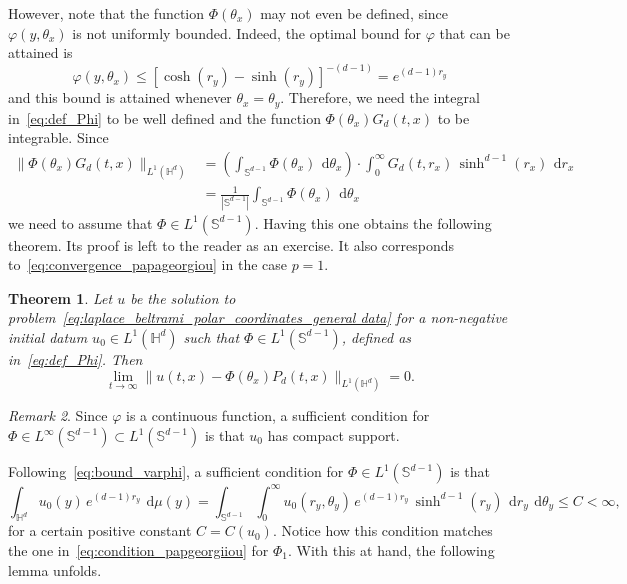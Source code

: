 \documentclass[12pt,longbibliography]{article}
\def\d{\,\mathrm{d}}
\def\d{\,\mathrm{d}}
\def\H{\mathbb{H}}
\newtheorem{thm}{Theorem}[section]
\theoremstyle{definition}
\theoremstyle{remark}
\newtheorem{rem}[thm]{Remark}
\theoremstyle{example}
\begin{document}
However, note that the function $\Phi(\theta_x)$ may not even be defined, since $\varphi(y,\theta_x)$ is not uniformly bounded. Indeed, the optimal bound for $\varphi$ that can be attained is
\begin{equation}\label{eq:bound_varphi}
\varphi(y,\theta_x)\leq \left[ \cosh (r_y)-\sinh (r_y)  \right]^{-(d-1) }= e^{(d-1) r_y}
\end{equation}
and this bound is attained whenever $\theta_x=\theta_y$. Therefore, we need the integral in~\eqref{eq:def_Phi} to be well defined and the function $\Phi(\theta_x)G_d(t,x)$ to be integrable. Since
\[
\begin{aligned}
\|\Phi(\theta_x)G_d(t,x)\|_{L^1(\H^d)}& = \left(\int_{\mathbb{S}^{d-1}}\Phi(\theta_x)\ \d \theta_x\right) \cdot \int_0^\infty G_d(t,r_x)\, \sinh^{d-1}(r_x)\ \d r_x\\[10pt] &=\frac{1}{|\mathbb{S}^{d-1}|} \int_{\mathbb{S}^{d-1}}\Phi(\theta_x)\ \d \theta_x
\end{aligned}
\]
we need to assume that $\Phi\in L^1(\mathbb{S}^{d-1})$. Having this one obtains the following theorem. Its proof is left to the reader as an exercise. It also corresponds to~\eqref{eq:convergence_papageorgiou} in the case $p=1$.

\begin{thm}\label{thm:convergence_without_rate}
	Let $u$ be the solution to problem~\eqref{eq:laplace_beltrami_polar_coordinates_general data} for a non-negative initial datum $u_0\in L^1(\H^d)$ such that $\Phi \in L^1(\mathbb{S}^{d-1})$, defined as in~\eqref{eq:def_Phi}. Then
	\[
	\lim\limits_{t\to\infty}\|u(t,x)-\Phi(\theta_x)P_d (t,x)\|_{L^1(\H^d)}=0.
	\]
\end{thm}

\begin{rem}\label{rem:varphi_continuous_phi_bounded}
	Since $\varphi$ is a continuous function, a sufficient condition for $\Phi \in L^\infty(\mathbb{S}^{d-1})\subset L^1(\mathbb{S}^{d-1})$ is that $u_0$ has compact support.
\end{rem}

Following~\eqref{eq:bound_varphi}, a sufficient condition  for $\Phi \in L^1(\mathbb{S}^{d-1})$ is that
\begin{equation}\label{eq:condition_exponential_initial_datum}
\int_{\H^d} u_0(y)\, e^{(d-1) r_y}\ \d\mu(y) = \int_{\mathbb{S}^{d-1}}\int_0^\infty u_0(r_y, \theta_y)\, e^{(d-1) r_y}\, \sinh^{d-1}(r_y)\ \d r_y\ \d \theta_y\leq C<\infty,
\end{equation}
for a certain positive constant $C=C(u_0)$. Notice how this condition matches the one in~\eqref{eq:condition_papgeorgiiou} for $\Phi_1$. With this at hand, the following lemma unfolds.
\end{document}
